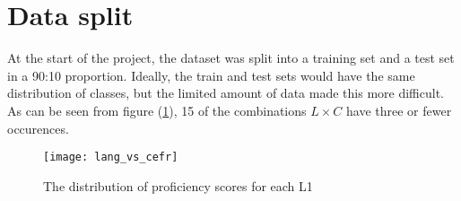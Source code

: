 \section{Data split}

At the start of the project, the dataset was split into a training set and a
test set in a 90:10 proportion. Ideally, the train and test sets would have
the same distribution of classes, but the limited amount of data made this
more difficult. As can be seen from figure (\ref{lang-vs-cefr}), 15 of the
combinations \(L\times C\) have three or fewer occurences.

\begin{figure}
  \centering
  \texttt{[image: lang\_vs\_cefr]}
  \caption{The distribution of proficiency scores for each L1}
  \label{lang-vs-cefr}
\end{figure}
